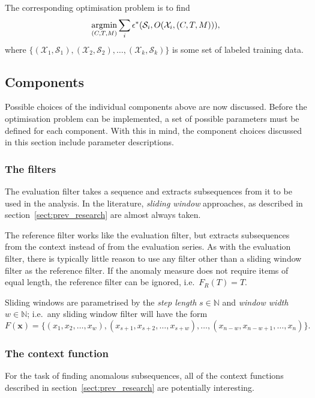 The corresponding optimisation problem is to find
\[
    \argmin_{(C, T, M)} \sum_i \epsilon^*(\mathcal{S}_i, O(\mathcal{X}_i, (C, T, M))),
\]
where $\{(\mathcal{X}_1, \mathcal{S}_1), (\mathcal{X}_2, \mathcal{S}_2), \dots, (\mathcal{X}_k, \mathcal{S}_k)\}$ is some set of labeled training data.

\subsection{Components}
\label{sect:components}

Possible choices of the individual components above are now discussed. Before the optimisation problem can be implemented, a set of possible parameters must be defined for each component. With this in mind, the component choices discussed in this section include parameter descriptions.

\subsubsection{The filters}

The evaluation filter takes a sequence and extracts subsequences from it to be used in the analysis. In the literature, \emph{sliding window} approaches, as described in section~\ref{sect:prev_research} are almost always taken.

The reference filter works like the evaluation filter, but extracts subsequences from the context instead of from the evaluation series. As with the evaluation filter, there is typically little reason to use any filter other than a sliding window filter as the reference filter. If the anomaly measure does not require items of equal length, the reference filter can be ignored, i.e.\ $F_R(T) = T$.

Sliding windows are parametrised by the \emph{step length} $s \in \mathbb{N}$ and \emph{window width} $w \in \mathbb{N}$; i.e.\ any sliding window filter will have the form
\[
    F(\mathbf{x}) = \{(x_1, x_2, \dots, x_w), (x_{s+1}, x_{s+2}, \dots, x_{s+w}), \dots, (x_{n-w}, x_{n-w+1}, \dots, x_{n})\}.
\]

\subsubsection{The context function}

For the task of finding anomalous subsequences, all of the context functions described in section~\ref{sect:prev_research} are potentially interesting.

